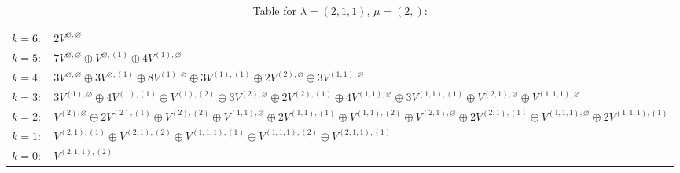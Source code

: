\renewcommand{\arraystretch}{1.6} 
\begin{table}[H]
\centering
\caption{Table for $\lambda = (2, 1, 1)$, $\mu = (2,)$:}
\begin{tabular}{|>{\centering\arraybackslash}p{15cm}|}
\hline
 $k = 6: \quad 2 V^{\varnothing, \varnothing} $ \\ \hline
 $k = 5: \quad 7 V^{\varnothing, \varnothing} \oplus V^{\varnothing, (1)} \oplus 4 V^{(1), \varnothing} $ \\ \hline
 $k = 4: \quad 3 V^{\varnothing, \varnothing} \oplus 3 V^{\varnothing, (1)} \oplus 8 V^{(1), \varnothing} \oplus 3 V^{(1), (1)} \oplus 2 V^{(2), \varnothing} \oplus 3 V^{(1, 1), \varnothing} $ \\ \hline
 $k = 3: \quad 3 V^{(1), \varnothing} \oplus 4 V^{(1), (1)} \oplus V^{(1), (2)} \oplus 3 V^{(2), \varnothing} \oplus 2 V^{(2), (1)} \oplus 4 V^{(1, 1), \varnothing} \oplus 3 V^{(1, 1), (1)} \oplus V^{(2, 1), \varnothing} \oplus V^{(1, 1, 1), \varnothing} $ \\ \hline
 $k = 2: \quad V^{(2), \varnothing} \oplus 2 V^{(2), (1)} \oplus V^{(2), (2)} \oplus V^{(1, 1), \varnothing} \oplus 2 V^{(1, 1), (1)} \oplus V^{(1, 1), (2)} \oplus V^{(2, 1), \varnothing} \oplus 2 V^{(2, 1), (1)} \oplus V^{(1, 1, 1), \varnothing} \oplus 2 V^{(1, 1, 1), (1)} $ \\ \hline
 $k = 1: \quad V^{(2, 1), (1)} \oplus V^{(2, 1), (2)} \oplus V^{(1, 1, 1), (1)} \oplus V^{(1, 1, 1), (2)} \oplus V^{(2, 1, 1), (1)} $ \\ \hline
 $k = 0: \quad V^{(2, 1, 1), (2)} $ \\ \hline
\end{tabular}
\end{table}

